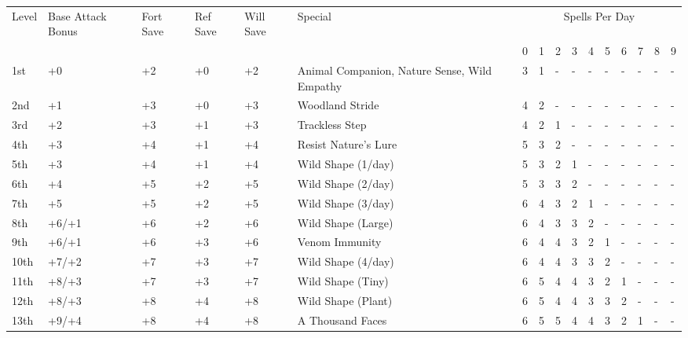 \begin{table}[htb]
\begin{small}
\begin{tabular}{lp{1.7cm}p{0.6cm}p{0.6cm}p{0.6cm}p{5.3cm}llllllllll}
Level  &Base Attack Bonus &Fort Save &Ref Save &Will Save &Special & \multicolumn{10}{c}{Spells Per Day}\\
       &                &    &    &    &                                               &0 &1 &2 &3 &4 &5 &6 &7 &8 &9 \\
1st    &+0              &+2  &+0  &+2  & Animal Companion, Nature Sense, Wild Empathy  &3 &1 &- &- &- &- &- &- &- &- \\
2nd    &+1              &+3  &+0  &+3  & Woodland Stride                               &4 &2 &- &- &- &- &- &- &- &- \\
3rd    &+2              &+3  &+1  &+3  & Trackless Step                                &4 &2 &1 &- &- &- &- &- &- &- \\
4th    &+3              &+4  &+1  &+4  & Resist Nature's Lure                          &5 &3 &2 &- &- &- &- &- &- &- \\
5th    &+3              &+4  &+1  &+4  & Wild Shape (1/day)                            &5 &3 &2 &1 &- &- &- &- &- &- \\
6th    &+4              &+5  &+2  &+5  & Wild Shape (2/day)                            &5 &3 &3 &2 &- &- &- &- &- &- \\
7th    &+5              &+5  &+2  &+5  & Wild Shape (3/day)                            &6 &4 &3 &2 &1 &- &- &- &- &- \\
8th    &+6/+1           &+6  &+2  &+6  & Wild Shape (Large)                            &6 &4 &3 &3 &2 &- &- &- &- &- \\
9th    &+6/+1           &+6  &+3  &+6  & Venom Immunity                                &6 &4 &4 &3 &2 &1 &- &- &- &- \\
10th   &+7/+2           &+7  &+3  &+7  & Wild Shape (4/day)                            &6 &4 &4 &3 &3 &2 &- &- &- &- \\
11th   &+8/+3           &+7  &+3  &+7  & Wild Shape (Tiny)                             &6 &5 &4 &4 &3 &2 &1 &- &- &- \\
12th   &+8/+3           &+8  &+4  &+8  & Wild Shape (Plant)                            &6 &5 &4 &4 &3 &3 &2 &- &- &- \\
13th   &+9/+4           &+8  &+4  &+8  & A Thousand Faces                              &6 &5 &5 &4 &4 &3 &2 &1 &- &- \\

\end{tabular}
\end{small}
\end{table}
